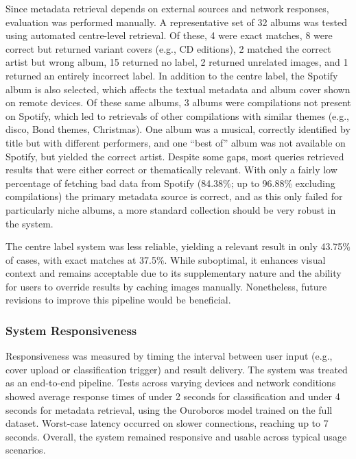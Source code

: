                 Since metadata retrieval depends on external sources and network responses, evaluation was performed manually. A representative set of 32 albums was tested using automated centre-level retrieval. Of these, 4 were exact matches, 8 were correct but returned variant covers (e.g., CD editions), 2 matched the correct artist but wrong album, 15 returned no label, 2 returned unrelated images, and 1 returned an entirely incorrect label. In addition to the centre label, the Spotify album is also selected, which affects the textual metadata and album cover shown on remote devices. Of these same albums, 3 albums were compilations not present on Spotify, which led to retrievals of other compilations with similar themes (e.g., disco, Bond themes, Christmas). One album was a musical, correctly identified by title but with different performers, and one “best of” album was not available on Spotify, but yielded the correct artist. Despite some gaps, most queries retrieved results that were either correct or thematically relevant. With only a fairly low percentage of fetching bad data from Spotify (84.38\%; up to 96.88\% excluding compilations) the primary metadata source is correct, and as this only failed for particularly niche albums, a more standard collection should be very robust in the system.
    
                The centre label system was less reliable, yielding a relevant result in only 43.75\% of cases, with exact matches at 37.5\%. While suboptimal, it enhances visual context and remains acceptable due to its supplementary nature and the ability for users to override results by caching images manually. Nonetheless, future revisions to improve this pipeline would be beneficial.
    
            \subsubsection{System Responsiveness}
    
                Responsiveness was measured by timing the interval between user input (e.g., cover upload or classification trigger) and result delivery. The system was treated as an end-to-end pipeline. Tests across varying devices and network conditions showed average response times of under 2 seconds for classification and under 4 seconds for metadata retrieval, using the Ouroboros model trained on the full dataset. Worst-case latency occurred on slower connections, reaching up to 7 seconds. Overall, the system remained responsive and usable across typical usage scenarios.
    
